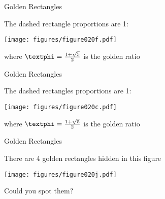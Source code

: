 \documentclass[14pt]{beamer}
\begin{document}

    \begin{frame}{Golden Rectangles}
        \begin{center}
            The dashed rectangle proportions are 1:\textphi
        \end{center}
        \hspace{4.1em} \texttt{[image: figures/figure020f.pdf]} \\
        \begin{center}
            where $\text{\textphi} =\tfrac{1+\sqrt{5}}{2}$ is the golden ratio
        \end{center}
    \end{frame}


    \begin{frame}{Golden Rectangles}
        \begin{center}
            The dashed rectangles proportions are 1:\textphi
        \end{center}
        \hspace{3.85em} \texttt{[image: figures/figure020c.pdf]} \\
        \begin{center}
            where $\text{\textphi} =\tfrac{1+\sqrt{5}}{2}$ is the golden ratio
        \end{center}
    \end{frame}


    \begin{frame}{Golden Rectangles}
        \begin{center}
            There are 4 golden rectangles hidden in this figure

            \bigskip

            \texttt{[image: figures/figure020j.pdf]} \\

            \medskip

            Could you spot them?
        \end{center}
    \end{frame}
\end{document}
